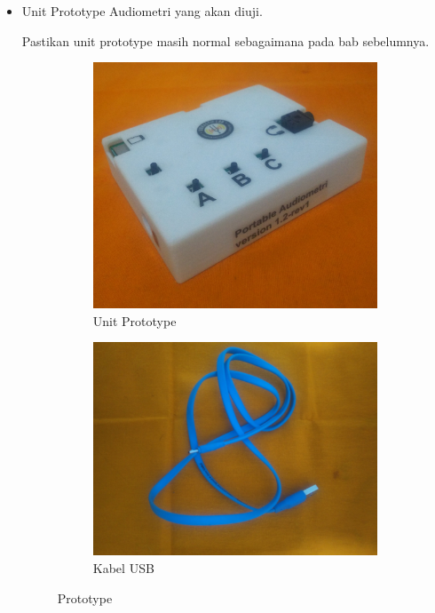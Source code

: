 \documentclass[12pt,]{article}
\begin{document}
	\begin{itemize}

		\item Unit Prototype Audiometri yang akan diuji.

		Pastikan unit prototype masih normal sebagaimana pada bab sebelumnya.

		\begin{figure}[!ht]
			\centering
			\begin{subfigure}[b]{0.3\textwidth}
				\includegraphics[width=\textwidth]{images/foto/unit}
				\caption{Unit Prototype}
			\end{subfigure}
			\begin{subfigure}[b]{0.3\textwidth}
				\includegraphics[width=\textwidth]{images/foto/kabel}
				\caption{Kabel USB}
			\end{subfigure}
			\caption{Prototype}
		\end{figure}


\end{itemize}
\end{document}
